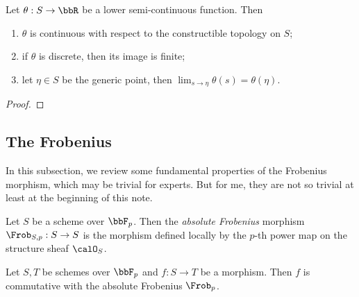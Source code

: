   \begin{lemma}\label{lem:properties_of_lower_semi-continuous_functions_on_noetherian_schemes}
    Let $\theta: S \to \bbR$ be a lower semi-continuous function.
    Then 
    \begin{enumerate}
      \item $\theta$ is continuous with respect to the constructible topology on $S$;
      \item if $\theta$ is discrete, then its image is finite;
      \item let $\eta \in S$ be the generic point, then $\lim_{s \to \eta} \theta(s) = \theta(\eta)$.
    \end{enumerate}
  \end{lemma}
  \begin{proof}
    \Yang{}
  \end{proof}




\subsection{The Frobenius}

  In this subsection, we review some fundamental properties of the Frobenius morphism, which may be trivial for experts. 
  But for me, they are not so trivial at least at the beginning of this note.

  \begin{definition}
    Let $S$ be a scheme over $\bbF_p$.
    Then the \emph{absolute Frobenius} morphism $\Frob_{S,p}: S \to S$ is the morphism defined locally by the $p$-th power map on the structure sheaf $\calO_S$.
  \end{definition}

  \begin{proposition}
    Let $S,T$ be schemes over $\bbF_p$ and $f: S \to T$ be a morphism.
    Then $f$ is commutative with the absolute Frobenius $\Frob_p$.
  \end{proposition}

